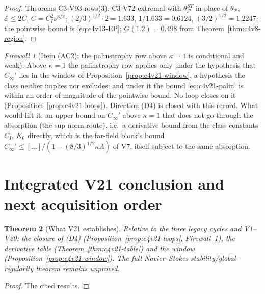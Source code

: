 \documentclass[11pt]{article}
\theoremstyle{plain}
\newtheorem{theorem}{Theorem}[section]
\theoremstyle{definition}
\theoremstyle{remark}
\newtheorem{firewall}[theorem]{Firewall}
\begin{document}
\begin{proof}
Theorems C3-V93-rows(3), C3-V72-extremal with \(\theta_{\mathcal P}^{ST}\) in place of
\(\theta_{\mathcal P}\), \(\mathcal E\le2C\), \(C=C_I^2\nu^{3/2}\); \((2/3)^{1/2}\cdot2=1.633\), \(1/1.633=0.6124\), \((3/2)^{1/2}=1.2247\);
the pointwise bound is \eqref{eq:c4v13-EP}; \(G(1.2)=0.498\) from
Theorem~\ref{thm:c4v8-region}.
\end{proof}

\begin{firewall}[Item (AC2): the palinstrophy row above \(\kappa=1\) is conditional and weak]
\label{fw:c4v21-palinstrophy}
Above \(\kappa=1\) the palinstrophy row applies only under the hypothesis
that \(C_\infty'\) lies in the window of Proposition~\ref{prop:c4v21-window}, a
hypothesis the class neither implies nor excludes; and under it the
bound \eqref{eq:c4v21-palin} is within an order of magnitude of the
pointwise bound.  No loop closes on it (Proposition~\ref{prop:c4v21-loops}).
Direction (D4) is closed with this record.  What would lift it: an
upper bound on \(C_\infty'\) above \(\kappa=1\) that does not go through the
absorption (the sup-norm route), i.e.\ a derivative bound from the
class constants \(C_I\), \(K_6\) directly, which is the far-field block's
bound \(C_\infty'\le[\dots]/(1-(8/3)^{1/2}\kappa A)\) of V7, itself subject to the same
absorption.
\end{firewall}

\section{Integrated V21 conclusion and next acquisition order}
\label{sec:c4v21-conclusion}

\begin{theorem}[What V21 establishes]
\label{thm:c4v21-conclusion}
Relative to the three legacy cycles and V1--V20: the closure of (D4)
(Proposition~\ref{prop:c4v21-loops}, Firewall~\ref{fw:c4v21-palinstrophy}),
the derivative table (Theorem~\ref{thm:c4v21-table}) and the window
(Proposition~\ref{prop:c4v21-window}).  The full Navier--Stokes
stability/global-regularity theorem remains unproved.
\end{theorem}

\begin{proof}
The cited results.
\end{proof}
\end{document}
